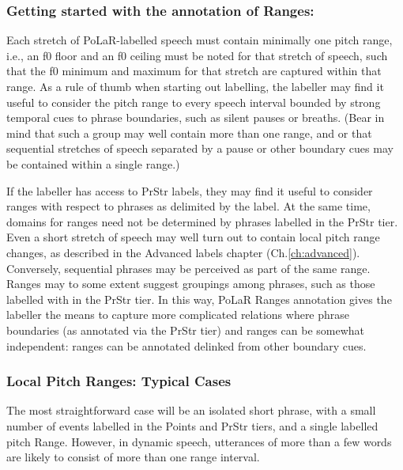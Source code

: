 \documentclass[11pt, twoside]{memoir}
\def\textlabel#1{{\relsize{-.5}\fontspec[Mapping=tex-text]{Roboto Mono}{#1}}}
\begin{document}
\subsubsection{Getting started with the annotation of Ranges:}\label{sec:getting-started-with-the-annotation-of-ranges}

Each stretch of PoLaR-labelled speech must contain minimally one pitch range, i.e., an f0 floor and an f0 ceiling must be noted for that stretch of speech, such that the f0 minimum and maximum for that stretch are captured within that range. As a rule of thumb when starting out labelling, the labeller may find it useful to consider the pitch range to every speech interval bounded by strong temporal cues to phrase boundaries, such as silent pauses or breaths. (Bear in mind that such a group may well contain more than one range, and or that sequential stretches of speech separated by a pause or other boundary cues may be contained within a single range.)

If the labeller has access to PrStr labels, they may find it useful to consider ranges with respect to phrases as delimited by the \textlabel{]} label. At the same time, domains for ranges need not be determined by phrases labelled in the PrStr tier. Even a short stretch of speech may well turn out to contain local pitch range changes, as described in the Advanced labels chapter (Ch.\ref{ch:advanced}). Conversely, sequential phrases may be perceived as part of the same range. Ranges may to some extent suggest groupings among phrases, such as those labelled with \textlabel{]} in the PrStr tier. In this way, PoLaR Ranges annotation gives the labeller the means to capture more complicated relations where phrase boundaries (as annotated via the PrStr tier) and ranges can be somewhat independent: ranges can be annotated delinked from other boundary cues.

\subsubsection{Local Pitch Ranges: Typical Cases}\label{sec:local-pitch-ranges-typical-cases}

The most straightforward case will be an isolated short phrase, with a small number of events labelled in the Points and PrStr tiers, and a single labelled pitch Range. However, in dynamic speech, utterances of more than a few words are likely to consist of more than one range interval.
\end{document}
